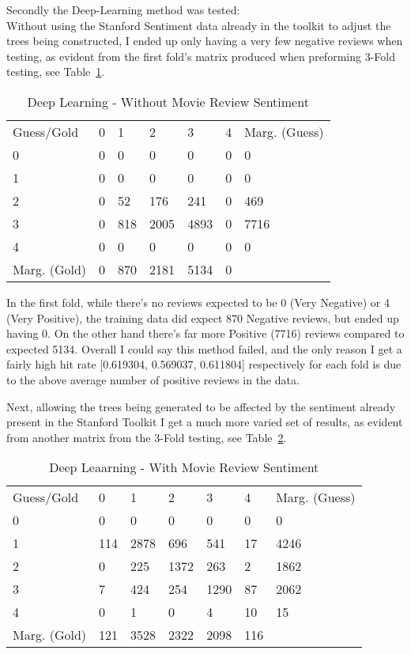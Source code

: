 \documentclass{sig-alternate}
\begin{document}
Secondly the Deep-Learning method was tested:\\
Without using the Stanford Sentiment data already in the toolkit to adjust the trees being constructed, I ended up only having a very few negative reviews when testing, as evident from the first fold's matrix produced when preforming 3-Fold testing, see Table~\ref{table:deepnon}.
\begin{table}[h!]
\caption{Deep Learning - Without Movie Review Sentiment}
\begin{tabular}{l l l l l l l}
Guess/Gold & 0 & 1 & 2 & 3 & 4 & Marg. (Guess)\\
0 & 0 & 0 & 0 & 0 & 0 & 0 \\
1&0&0&0&0&0&0\\
               2 &     0  &    52    & 176     &241     &  0 &    469\\
               3      & 0    & 818   & 2005  &  4893 &      0 &   7716\\
               4     &  0     &  0      & 0    &   0     &  0      & 0\\
    Marg. (Gold)     &  0  &   870    &2181    &5134      & 0
\end{tabular}
\label{table:deepnon}
\end{table}
In the first fold, while there's no reviews expected to be 0 (Very Negative) or 4 (Very Positive), the training data did expect 870 Negative reviews, but ended up having 0. On the other hand there's far more Positive (7716) reviews compared to expected 5134. Overall I could say this method failed, and the only reason I get a fairly high hit rate [0.619304, 0.569037, 0.611804] respectively for each fold is due to the above average number of positive reviews in the data.

Next, allowing the trees being generated to be affected by the sentiment already present in the Stanford Toolkit I get a much more varied set of results, as evident from another matrix from the 3-Fold testing, see Table~\ref{table:deepsem}.
\begin{table}[h!]
\caption{Deep Leaarning - With Movie Review Sentiment}
\begin{tabular}{l l l l l l l}
Guess/Gold & 0 & 1 & 2 & 3 & 4 & Marg. (Guess)\\
0 & 0 & 0 & 0 & 0 & 0 & 0 \\
1 & 114 & 2878 & 696 & 541 & 17 & 4246 \\
2 & 0 & 225 & 1372 & 263 & 2 & 1862 \\ 
3 & 7 & 424 & 254 & 1290 & 87 & 2062 \\
4 &  0 & 1 & 0 & 4 & 10 & 15 \\
Marg. (Gold) & 121 & 3528 & 2322 & 2098 & 116
\end{tabular}
\label{table:deepsem}
\end{table}
\end{document}
